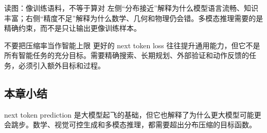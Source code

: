 \begin{knowledgebox}{读图：像训练语料，不等于算对}
左侧“分布接近”解释为什么模型语言流畅、知识丰富；右侧“精度不足”解释为什么数学、几何和物理仍会错。多模态推理需要的是精确约束，而不是只让输出更像训练样本。
\end{knowledgebox}

\begin{warningbox}{不要把压缩率当作智能上限}
更好的 next token loss 往往提升通用能力，但它不是所有智能任务的充分目标。需要精确搜索、长期规划、外部验证和动作反馈的任务，必须引入额外目标和过程。
\end{warningbox}

\subsection{本章小结}

next token prediction 是大模型起飞的基础，但它也解释了为什么更大模型可能更会跳步。数学、视觉可控生成和多模态推理，都需要超出分布压缩的目标函数。

